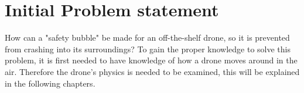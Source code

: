 \section{Initial Problem statement}\label{s:initial_problem}
How can a "safety bubble" be made for an off-the-shelf drone, so it is prevented from crashing into its surroundings?
\newline
To gain the proper knowledge to solve this problem, it is first needed to have knowledge of how a drone moves around in the air. Therefore the drone's physics is needed to be examined, this will be explained in the following chapters.
